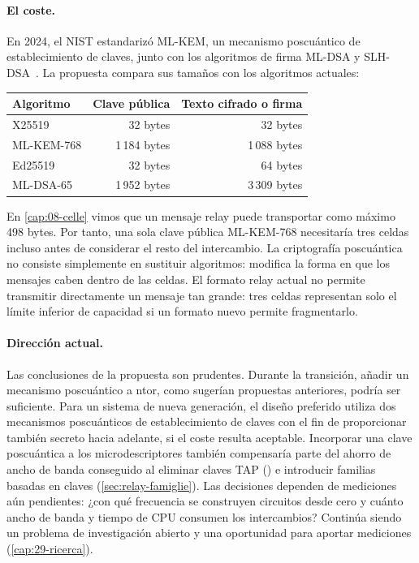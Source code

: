 \paragraph{El coste.} En 2024, el NIST estandarizó ML-KEM, un mecanismo poscuántico de establecimiento de claves, junto con los algoritmos de firma ML-DSA y SLH-DSA~\cite{nistpqc2024}. La propuesta compara sus tamaños con los algoritmos actuales:
\begin{center}\small
\begin{tabular}{@{}lrr@{}}
\toprule
Algoritmo & Clave pública & Texto cifrado o firma \\
\midrule
X25519 & 32 bytes & 32 bytes \\
ML-KEM-768 & 1\,184 bytes & 1\,088 bytes \\
Ed25519 & 32 bytes & 64 bytes \\
ML-DSA-65 & 1\,952 bytes & 3\,309 bytes \\
\bottomrule
\end{tabular}
\end{center}
En \cref{cap:08-celle} vimos que un mensaje relay puede transportar como máximo 498 bytes. Por tanto, una sola clave pública ML-KEM-768 necesitaría tres celdas incluso antes de considerar el resto del intercambio. La criptografía poscuántica no consiste simplemente en sustituir algoritmos: modifica la forma en que los mensajes caben dentro de las celdas. El formato relay actual no permite transmitir directamente un mensaje tan grande: tres celdas representan solo el límite inferior de capacidad si un formato nuevo permite fragmentarlo.

\paragraph{Dirección actual.} Las conclusiones de la propuesta son prudentes. Durante la transición, añadir un mecanismo poscuántico a ntor, como sugerían propuestas anteriores, podría ser suficiente. Para un sistema de nueva generación, el diseño preferido utiliza dos mecanismos poscuánticos de establecimiento de claves con el fin de proporcionar también secreto hacia adelante, si el coste resulta aceptable. Incorporar una clave poscuántica a los microdescriptores también compensaría parte del ahorro de ancho de banda conseguido al eliminar claves TAP () e introducir familias basadas en claves (\cref{sec:relay-famiglie}). Las decisiones dependen de mediciones aún pendientes: ¿con qué frecuencia se construyen circuitos desde cero y cuánto ancho de banda y tiempo de CPU consumen los intercambios? Continúa siendo un problema de investigación abierto y una oportunidad para aportar mediciones (\cref{cap:29-ricerca}).

